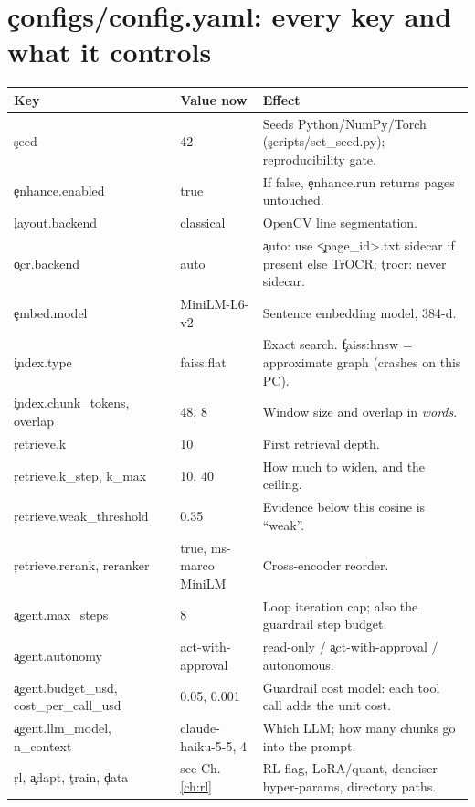 \section{\c{configs/config.yaml}: every key and what it controls}
\begin{longtable}{@{}p{3.1cm}p{4.2cm}p{7.2cm}@{}}
\toprule Key & Value now & Effect \\ \midrule \endhead
\c{seed} & 42 & Seeds Python/NumPy/Torch (\c{scripts/set\_seed.py}); reproducibility gate. \\
\c{enhance.enabled} & true & If false, \c{enhance.run} returns pages untouched. \\
\c{layout.backend} & classical & OpenCV line segmentation. \\
\c{ocr.backend} & auto & \c{auto}: use \c{<page\_id>.txt} sidecar if present else TrOCR; \c{trocr}: never sidecar. \\
\c{embed.model} & MiniLM-L6-v2 & Sentence embedding model, 384-d. \\
\c{index.type} & faiss:flat & Exact search. \c{faiss:hnsw} = approximate graph (crashes on this PC). \\
\c{index.chunk\_tokens, overlap} & 48, 8 & Window size and overlap in \emph{words}. \\
\c{retrieve.k} & 10 & First retrieval depth. \\
\c{retrieve.k\_step, k\_max} & 10, 40 & How much to widen, and the ceiling. \\
\c{retrieve.weak\_threshold} & 0.35 & Evidence below this cosine is ``weak''. \\
\c{retrieve.rerank, reranker} & true, ms-marco MiniLM & Cross-encoder reorder. \\
\c{agent.max\_steps} & 8 & Loop iteration cap; also the guardrail step budget. \\
\c{agent.autonomy} & act-with-approval & \c{read-only} / \c{act-with-approval} / autonomous. \\
\c{agent.budget\_usd, cost\_per\_call\_usd} & 0.05, 0.001 & Guardrail cost model: each tool call adds the unit cost. \\
\c{agent.llm\_model, n\_context} & claude-haiku-5-5, 4 & Which LLM; how many chunks go into the prompt. \\
\c{rl}, \c{adapt}, \c{train}, \c{data} & see Ch.\ref{ch:rl} & RL flag, LoRA/quant, denoiser hyper-params, directory paths. \\
\bottomrule\end{longtable}


